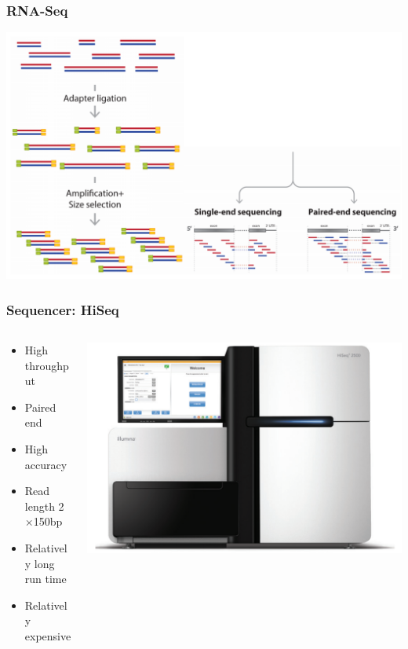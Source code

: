 \documentclass{beamer}			  %
\begin{document}
\begin{frame}
	\frametitle{RNA-Seq}
	\begin{center}
		\includegraphics[height=0.8\textheight]{figures/dge_01bp.png}
	\end{center}
\end{frame}

\begin{frame}
\frametitle{Sequencer: HiSeq}
  \begin{columns}[T]
	\begin{column}{.62\textwidth}
	\begin{itemize}
		\item High throughput
		\item Paired end
		\item High accuracy
		\item Read length 2$\times$150bp
		\item Relatively long run time
		\item Relatively expensive
	\end{itemize}
	\end{column}
	\begin{column}{.38\textwidth}
		\includegraphics[width=\textwidth]{figures/dge_02p.png}
	\end{column}
  \end{columns}
\end{frame}
\end{document}
